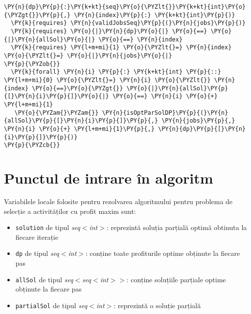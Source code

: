 \begin{itemize}
\begin{Verbatim}[commandchars=\\\{\}, fontsize=\footnotesize]
 \PY{n}{dp}\PY{p}{:}\PY{k+kt}{seq}\PY{o}{\PYZlt{}}\PY{k+kt}{int}\PY{o}{\PYZgt{}}\PY{p}{,} \PY{n}{index}\PY{p}{:} \PY{k+kt}{int}\PY{p}{)}
  \PY{k}{requires} \PY{n}{validJobsSeq}\PY{p}{(}\PY{n}{jobs}\PY{p}{)}
  \PY{k}{requires} \PY{o}{|}\PY{n}{dp}\PY{o}{|} \PY{o}{==} \PY{o}{|}\PY{n}{allSol}\PY{o}{|} \PY{o}{==} \PY{n}{index}
  \PY{k}{requires} \PY{l+m+mi}{1} \PY{o}{\PYZlt{}=} \PY{n}{index} \PY{o}{\PYZlt{}=} \PY{o}{|}\PY{n}{jobs}\PY{o}{|}
\PY{p}{\PYZob{}}
  \PY{k}{forall} \PY{n}{i} \PY{p}{:} \PY{k+kt}{int} \PY{p}{::} \PY{l+m+mi}{0} \PY{o}{\PYZlt{}=} \PY{n}{i} \PY{o}{\PYZlt{}} \PY{n}{index} \PY{o}{==}\PY{o}{\PYZgt{}} \PY{o}{|}\PY{n}{allSol}\PY{p}{[}\PY{n}{i}\PY{p}{]}\PY{o}{|} \PY{o}{==} \PY{n}{i} \PY{o}{+} \PY{l+m+mi}{1} 
   \PY{o}{\PYZam{}\PYZam{}} \PY{n}{isOptParSolDP}\PY{p}{(}\PY{n}{allSol}\PY{p}{[}\PY{n}{i}\PY{p}{]}\PY{p}{,} \PY{n}{jobs}\PY{p}{,} \PY{n}{i} \PY{o}{+} \PY{l+m+mi}{1}\PY{p}{,} \PY{n}{dp}\PY{p}{[}\PY{n}{i}\PY{p}{]}\PY{p}{)}
\PY{p}{\PYZcb{}}
\end{Verbatim}

\end{itemize}

\section{Punctul de intrare în algoritm}
Variabilele locale folosite pentru rezolvarea algoritmului pentru problema de selecție a activităților cu profit maxim sunt:
\begin{itemize}
    \item \texttt{solution} de tipul \textit{seq$<$int$>$}: reprezintă soluția parțială optimă obtinuta la fiecare iterație
    \item \texttt{dp} de tipul \textit{seq$<$int$>$}:
    conține toate profiturile optime obținute la fiecare pas
    \item \texttt{allSol} de tipul \textit{seq$<$seq$<$int$>$$>$}:
    conține soluțiile parțiale optime obținute la fiecare pas
    \item \texttt{partialSol} de tipul \textit{seq$<$int$>$}: reprezintă o soluție parțială   
\end{itemize}

